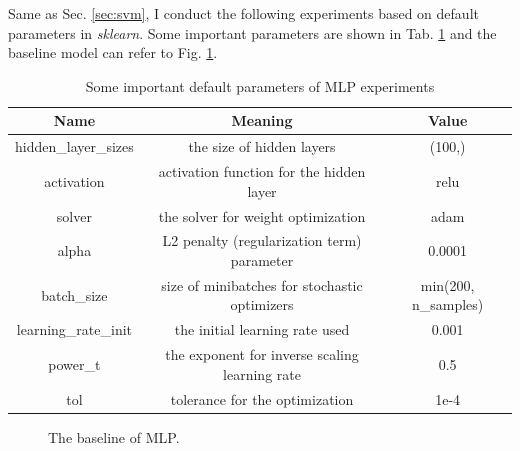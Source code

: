 \documentclass[12pt,a4paper]{article}
\theoremstyle{definition}
\begin{document}
\vspace{0.01\linewidth}
Same as Sec. \ref{sec:svm}, I conduct the following experiments based on default parameters in \textit{sklearn}. Some important parameters are shown in Tab. \ref{tab:default-para-mlp} and the baseline model can refer to Fig. \ref{fig:mlp-baseline}.

\begin{table}[H]
	\renewcommand\arraystretch{1.35}
	\caption{Some important default parameters of MLP experiments}
	\label{tab:default-para-mlp}
	\centering
	
	\begin{tabular}{c|c|c}
		\centering
		Name & Meaning & Value \\
		\hline
		\hline
		
		hidden\_layer\_sizes & the size of hidden layers & (100,) \\
		activation & activation function for the hidden layer & relu \\
		solver & the solver for weight optimization & adam \\
		alpha & L2 penalty (regularization term) parameter & 0.0001 \\
		batch\_size & size of minibatches for stochastic optimizers & min(200, n\_samples) \\
		learning\_rate\_init & the initial learning rate used & 0.001 \\
		power\_t & the exponent for inverse scaling learning rate & 0.5 \\
		tol & tolerance for the optimization & 1e-4 \\
		
	\end{tabular}
\end{table}

\begin{figure}[H]
	\centering
	\caption{The baseline of MLP.}
	\label{fig:mlp-baseline}
\end{figure}
\end{document}
